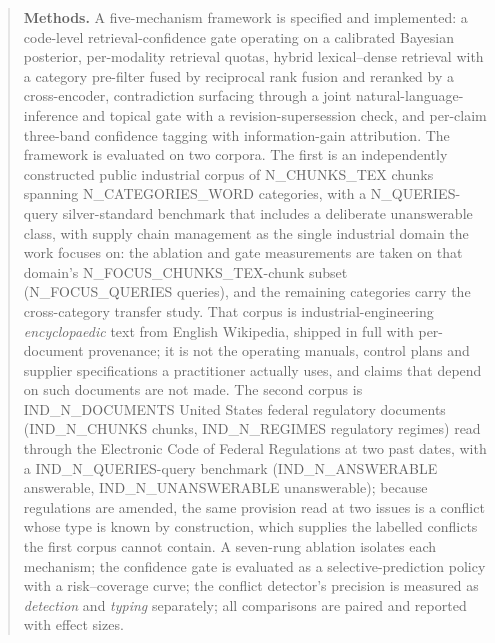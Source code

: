 \documentclass[preprint,3p,times]{elsarticle}
\begin{document}
\begin{abstract}
\textbf{Methods.} A five-mechanism framework is specified and implemented:
a code-level retrieval-confidence gate operating on a calibrated Bayesian
posterior, per-modality retrieval quotas, hybrid lexical--dense retrieval with
a category pre-filter fused by reciprocal rank fusion and reranked by a
cross-encoder, contradiction surfacing through a joint natural-language-
inference and topical gate with a revision-supersession check, and per-claim
three-band confidence tagging with information-gain attribution. The framework
is evaluated on two corpora. The first is an independently constructed public
industrial corpus of {{N_CHUNKS_TEX}}
chunks spanning {{N_CATEGORIES_WORD}} categories, with a {{N_QUERIES}}-query silver-standard benchmark
that includes a deliberate unanswerable class, with supply chain management as the
single industrial domain the work focuses on: the ablation and gate measurements
are taken on that domain's {{N_FOCUS_CHUNKS_TEX}}-chunk subset ({{N_FOCUS_QUERIES}}
queries), and the remaining categories carry the cross-category transfer study.
That corpus is industrial-engineering
\emph{encyclopaedic} text from English Wikipedia, shipped in full with per-document
provenance; it is not the operating manuals, control plans and supplier
specifications a practitioner actually uses, and claims that depend on such
documents are not made. The second corpus is {{IND_N_DOCUMENTS}} United States
federal regulatory documents ({{IND_N_CHUNKS}} chunks, {{IND_N_REGIMES}} regulatory
regimes) read through the Electronic Code of Federal Regulations at two past
dates, with a {{IND_N_QUERIES}}-query benchmark ({{IND_N_ANSWERABLE}} answerable,
{{IND_N_UNANSWERABLE}} unanswerable); because regulations are amended, the same
provision read at two issues is a conflict whose type is known by construction,
which supplies the labelled conflicts the first corpus cannot contain. A
seven-rung ablation isolates
each mechanism; the confidence gate is evaluated as a selective-prediction
policy with a risk--coverage curve; the conflict detector's precision is
measured as \emph{detection} and \emph{typing} separately; all comparisons are
paired and reported with effect sizes.


\end{abstract}
\end{document}
